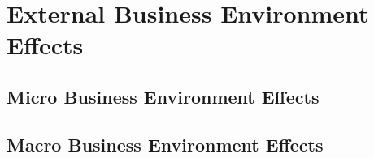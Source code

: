 \section{External Business Environment Effects}
\subsection{Micro Business Environment Effects}






\subsection{Macro Business Environment Effects}





